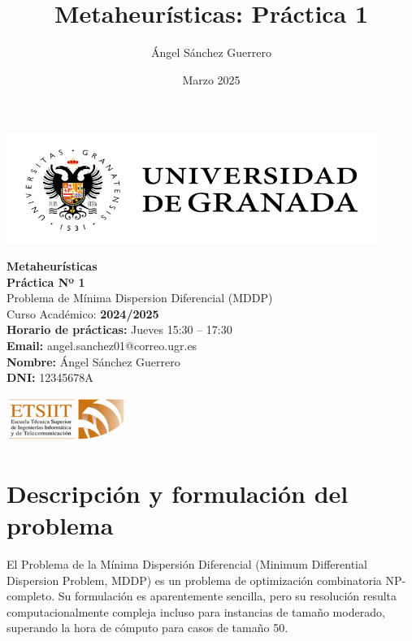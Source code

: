 \documentclass{article}
\title{Metaheurísticas: Práctica 1}
\author{Ángel Sánchez Guerrero}
\date{Marzo 2025}
\begin{document}
\thispagestyle{empty}

\begin{center}
    \includegraphics[width=12cm]{logo_ugr.jpg}
\end{center}

\vspace{2cm}

\begin{center}
    {\Huge \textbf{Metaheurísticas}} \\[3em]
    {\LARGE \textbf{Práctica Nº 1}} \\[1em]
    {\Large Problema de Mínima Dispersion Diferencial (MDDP)} \\[3em]

    {\large Curso Académico: \textbf{2024/2025}} \\[3em]

    {\large \textbf{Horario de prácticas:} Jueves 15:30 – 17:30} \\
    {\large \textbf{Email:} angel.sanchez01@correo.ugr.es} \\
    {\large \textbf{Nombre:} Ángel Sánchez Guerrero} \\
    {\large \textbf{DNI:} 12345678A} \\
\end{center}

\vfill

\begin{center}
    \includegraphics[width=4cm]{etsiit_logo.png}
\end{center}

\newpage
\tableofcontents
\newpage

\section{Descripción y formulación del problema}

El Problema de la Mínima Dispersión Diferencial (Minimum Differential Dispersion Problem, MDDP) es un problema de optimización combinatoria NP-completo. Su formulación es aparentemente sencilla, pero su resolución resulta computacionalmente compleja incluso para instancias de tamaño moderado, superando la hora de cómputo para casos de tamaño 50.
\end{document}
